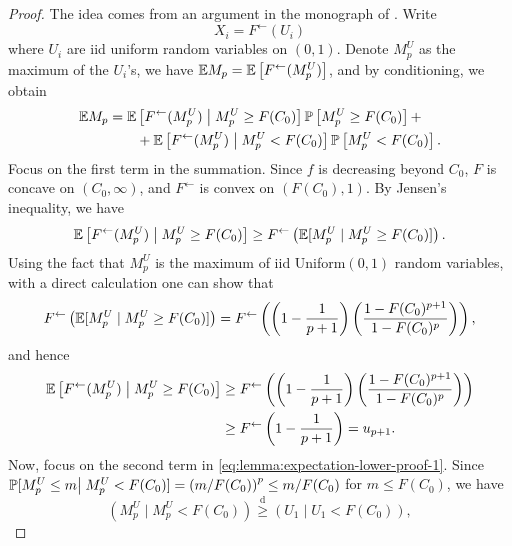 \begin{proof}%
The idea comes from an argument in the monograph of \cite{boucheron:lugosi:massart:2013}.  Write 
$$
X_i = F^{\leftarrow}(U_i)
$$
where $U_i$ are iid uniform random variables on $(0,1)$.
Denote $M^{U}_p$ as the maximum of the $U_i$'s, we have $\E M_p = \E\left[F^{\leftarrow}(M^{U}_p)\right]$, and by conditioning, we obtain
\begin{align} \label{eq:lemma:expectation-lower-proof-1}
    \E M_p &= \E\left[F^{\leftarrow}(M^{U}_p)\;\big|\;M^{U}_p \ge F(C_0)\right] \P\left[M^{U}_p \ge F(C_0)\right] + \nonumber \\ 
           &\quad\quad +\E\left[F^{\leftarrow}(M^{U}_p)\;\big|\;M^{U}_p < F(C_0)\right] \P\left[M^{U}_p < F(C_0)\right]. 
\end{align} 
Focus on the first term in the summation. Since $f$ is decreasing beyond $C_0$, $F$ is concave on $(C_0, \infty)$, and $F^{\leftarrow}$ is convex on $(F(C_0), 1)$. By Jensen's inequality, we have
\begin{equation*}
    \E\left[F^{\leftarrow}(M^{U}_p)\;\big|\;M^{U}_p \ge F(C_0)\right] 
        \ge F^{\leftarrow}\left(\E[M^{U}_p\;|\;M^{U}_p\ge F(C_0)]\right).
\end{equation*}
Using the fact that $M_p^U$ is the maximum of iid Uniform$(0,1)$ random variables, with a direct calculation one can show that 
\begin{equation*}
    F^{\leftarrow}\left(\E[M^{U}_p\;|\;M^{U}_p\ge F(C_0)]\right)
    = F^{\leftarrow}\left(\left(1-\frac{1}{p+1}\right)\left(\frac{1-F(C_0)^{p+1}}{1-F(C_0)^{p}}\right)\right),
\end{equation*}
and hence
\begin{align} \label{e:lemma:expectation-lower-bound-1.5}
    \E\left[F^{\leftarrow}(M^{U}_p)\;\big|\;M^{U}_p \ge F(C_0)\right] 
        &\ge F^{\leftarrow}\left(\left(1-\frac{1}{p+1}\right)\left(\frac{1-F(C_0)^{p+1}}{1-F(C_0)^{p}}\right)\right) \nonumber\\
        &\ge F^{\leftarrow}\left(1-\frac{1}{p+1}\right) = u_{p+1}.
\end{align}
Now, focus on the second term in \eqref{eq:lemma:expectation-lower-proof-1}. Since 
$\P[M^{U}_p\le m\big|\;M^{U}_p < F(C_0)] = \left(m/F(C_0)\right)^p \le m/F(C_0)$ for $m\le F(C_0)$, we have
$$\left(M^{U}_p\;\big|\;M^{U}_p < F(C_0)\right)\stackrel{\text{d}}{\ge} \left(U_1\;\big|\;U_1 < F(C_0)\right),$$

\end{proof}

